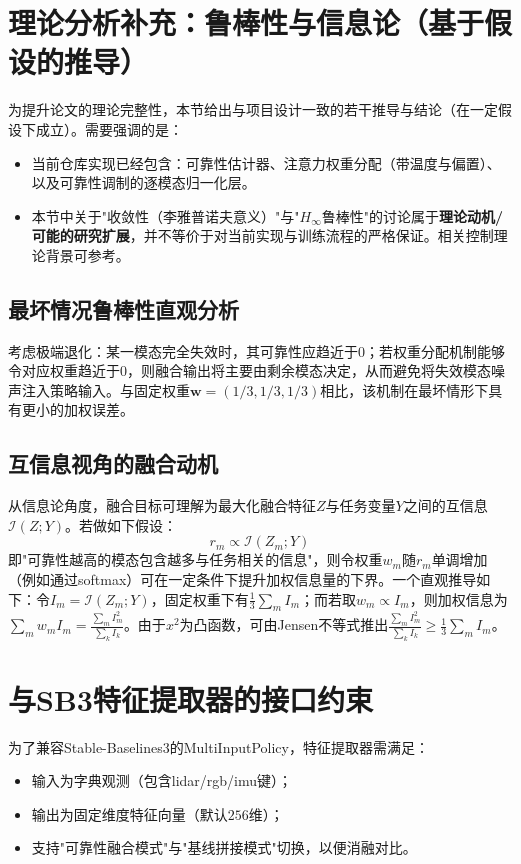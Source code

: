 \section{理论分析补充：鲁棒性与信息论（基于假设的推导）}
为提升论文的理论完整性，本节给出与项目设计一致的若干推导与结论（在一定假设下成立）。需要强调的是：
\begin{itemize}
    \item 当前仓库实现已经包含：可靠性估计器、注意力权重分配（带温度与偏置）、以及可靠性调制的逐模态归一化层。
    \item 本节中关于"收敛性（李雅普诺夫意义）"与"$H_\infty$鲁棒性"的讨论属于\textbf{理论动机/可能的研究扩展}，并不等价于对当前实现与训练流程的严格保证。相关控制理论背景可参考\cite{khalil2002nonlinear,zhou1996hinf}。
\end{itemize}

\subsection{最坏情况鲁棒性直观分析}
考虑极端退化：某一模态完全失效时，其可靠性应趋近于0；若权重分配机制能够令对应权重趋近于0，则融合输出将主要由剩余模态决定，从而避免将失效模态噪声注入策略输入。与固定权重$\mathbf{w}=(1/3,1/3,1/3)$相比，该机制在最坏情形下具有更小的加权误差。

\subsection{互信息视角的融合动机}
从信息论角度，融合目标可理解为最大化融合特征$Z$与任务变量$Y$之间的互信息$\mathcal{I}(Z;Y)$\cite{cover2006information}。若做如下假设：
\begin{equation}
    r_m \propto \mathcal{I}(Z_m;Y)
\end{equation}
即"可靠性越高的模态包含越多与任务相关的信息"，则令权重$w_m$随$r_m$单调增加（例如通过softmax）可在一定条件下提升加权信息量的下界。一个直观推导如下：令$I_m=\mathcal{I}(Z_m;Y)$，固定权重下有$\frac{1}{3}\sum_m I_m$；而若取$w_m\propto I_m$，则加权信息为$\sum_m w_m I_m=\frac{\sum_m I_m^2}{\sum_k I_k}$。由于$x^2$为凸函数，可由Jensen不等式推出$\frac{\sum_m I_m^2}{\sum_k I_k}\ge \frac{1}{3}\sum_m I_m$。

\section{与SB3特征提取器的接口约束}
为了兼容Stable-Baselines3的MultiInputPolicy，特征提取器需满足：
\begin{itemize}
    \item 输入为字典观测（包含lidar/rgb/imu键）；
    \item 输出为固定维度特征向量（默认$256$维）；
    \item 支持"可靠性融合模式"与"基线拼接模式"切换，以便消融对比。
\end{itemize}
